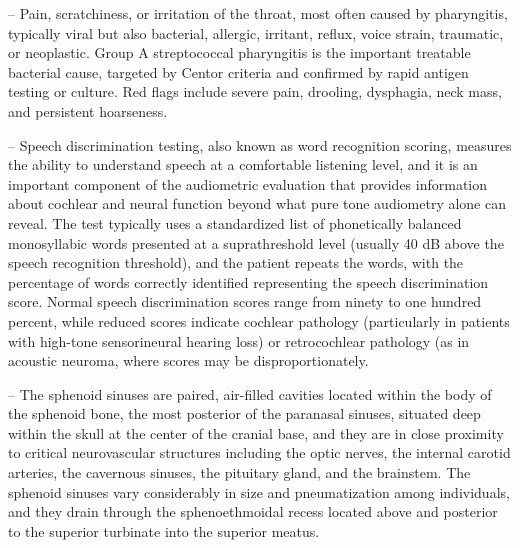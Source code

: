 -- Pain, scratchiness, or irritation of the throat, most often caused by pharyngitis, typically viral but also bacterial, allergic, irritant, reflux, voice strain, traumatic, or neoplastic. Group A streptococcal pharyngitis is the important treatable bacterial cause, targeted by Centor criteria and confirmed by rapid antigen testing or culture. Red flags include severe pain, drooling, dysphagia, neck mass, and persistent hoarseness.

-- Speech discrimination testing, also known as word recognition scoring, measures the ability to understand speech at a comfortable listening level, and it is an important component of the audiometric evaluation that provides information about cochlear and neural function beyond what pure tone audiometry alone can reveal. The test typically uses a standardized list of phonetically balanced monosyllabic words presented at a suprathreshold level (usually 40 dB above the speech recognition threshold), and the patient repeats the words, with the percentage of words correctly identified representing the speech discrimination score. Normal speech discrimination scores range from ninety to one hundred percent, while reduced scores indicate cochlear pathology (particularly in patients with high-tone sensorineural hearing loss) or retrocochlear pathology (as in acoustic neuroma, where scores may be disproportionately.

-- The sphenoid sinuses are paired, air-filled cavities located within the body of the sphenoid bone, the most posterior of the paranasal sinuses, situated deep within the skull at the center of the cranial base, and they are in close proximity to critical neurovascular structures including the optic nerves, the internal carotid arteries, the cavernous sinuses, the pituitary gland, and the brainstem. The sphenoid sinuses vary considerably in size and pneumatization among individuals, and they drain through the sphenoethmoidal recess located above and posterior to the superior turbinate into the superior meatus.

